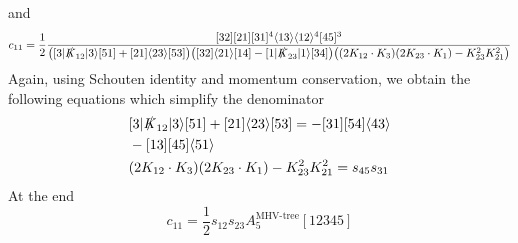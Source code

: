 and
\begin{equation*}
c_{11} = \frac{1}{2}\frac{[32][21][31]^4\langle 13\rangle\langle 12 \rangle^4 [45]^3}{\big( [3|\slashed{K}_{12}|3\rangle [51] + [21]\langle 23\rangle [53]\big)
\big( [32]\langle 21\rangle[14] - [1|\slashed{K}_{23}|1\rangle[34]\big)
\big( (2K_{12}\cdot K_3)(2K_{23}\cdot K_1) - K_{23}^2K_{21}^2\big)
}
\end{equation*}
Again, using Schouten identity and momentum conservation, we obtain the following equations which simplify the denominator
\begin{equation*}
\begin{split}
& [3|\slashed{K}_{12}|3\rangle [51] + [21]\langle 23\rangle [53] = -[31][54]\langle 43 \rangle 
\\
& -[13][45]\langle 51 \rangle
\\
&
(2K_{12}\cdot K_3)(2K_{23}\cdot K_1) - K_{23}^2K_{21}^2 = s_{45}s_{31}
\end{split}
\end{equation*}
At the end
\begin{equation*}
c_{11} = \frac{1}{2}s_{12}s_{23}A_5^{\textrm{MHV-tree}}[12345]
\end{equation*}
%
%
\iffalse
\begin{figure}
  \centering
    \texttt{[image: A5-16]}
    \caption{A5-16}
  \label{A5-16}
\end{figure}
\fi
%
%
